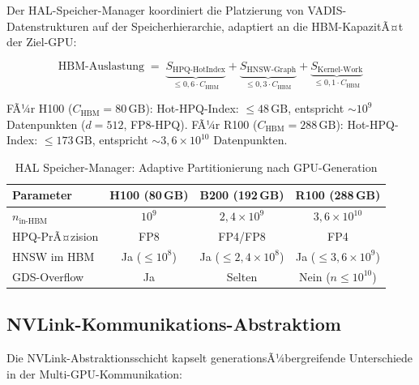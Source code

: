 ﻿\documentclass[12pt,a4paper]{article}
\begin{document}
Der HAL-Speicher-Manager koordiniert die Platzierung von
VADIS-Datenstrukturen auf der Speicherhierarchie,
adaptiert an die HBM-KapazitÃ¤t der Ziel-GPU:

\begin{equation}
  \text{HBM-Auslastung} \;=\;
  \underbrace{S_{\text{HPQ-HotIndex}}}_{\leq 0{,}6 \cdot C_{\text{HBM}}}
  + \underbrace{S_{\text{HNSW-Graph}}}_{\leq 0{,}3 \cdot C_{\text{HBM}}}
  + \underbrace{S_{\text{Kernel-Work}}}_{\leq 0{,}1 \cdot C_{\text{HBM}}}
\end{equation}

FÃ¼r H100 ($C_{\text{HBM}} = 80\,\text{GB}$):
Hot-HPQ-Index: $\leq 48\,\text{GB}$, entspricht
$\sim 10^9$ Datenpunkten ($d=512$, FP8-HPQ).
FÃ¼r R100 ($C_{\text{HBM}} = 288\,\text{GB}$):
Hot-HPQ-Index: $\leq 173\,\text{GB}$, entspricht
$\sim 3{,}6 \times 10^{10}$ Datenpunkten.

\begin{table}[ht]
\centering
\small
\caption{HAL Speicher-Manager: Adaptive Partitionierung nach GPU-Generation}
\label{tab:memory_manager}
\begin{tabular}{@{}lccc@{}}
\toprule
\textbf{Parameter} & \textbf{H100 (80\,GB)} & \textbf{B200 (192\,GB)} & \textbf{R100 (288\,GB)} \\
\midrule
$n_{\text{in-HBM}}$ & $10^9$ & $2{,}4 \times 10^9$ & $3{,}6 \times 10^{10}$ \\
HPQ-PrÃ¤zision & FP8 & FP4/FP8 & FP4 \\
HNSW im HBM & Ja ($\leq 10^8$) & Ja ($\leq 2{,}4\times10^8$) & Ja ($\leq 3{,}6\times10^9$) \\
GDS-Overflow & Ja & Selten & Nein ($n \leq 10^{10}$) \\
\bottomrule
\end{tabular}
\end{table}

\subsection{NVLink-Kommunikations-Abstraktiom}
\label{sub:nvlink_abstraction}

Die NVLink-Abstraktionsschicht kapselt generationsÃ¼bergreifende
Unterschiede in der Multi-GPU-Kommunikation:
\end{document}
